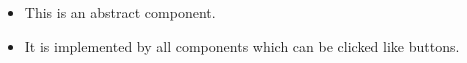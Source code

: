 \begin{itemize}
\item This is an abstract component.
\item It is implemented by all components which can be clicked like buttons.
\end{itemize}
 
